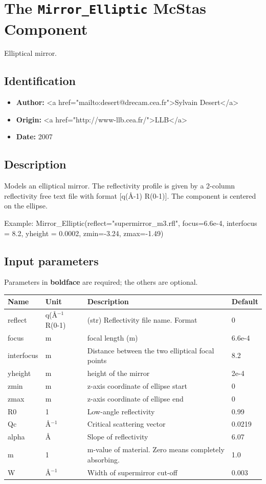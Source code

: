 \section{The \texttt{Mirror\_Elliptic} McStas Component}
Elliptical mirror.

\subsection*{Identification}
\begin{itemize}
  \item \textbf{Author:} \textless{}a href="mailto:desert@drecam.cea.fr"\textgreater{}Sylvain Desert\textless{}/a\textgreater{}
  \item \textbf{Origin:} \textless{}a href="http://www-llb.cea.fr/"\textgreater{}LLB\textless{}/a\textgreater{}
  \item \textbf{Date:} 2007
\end{itemize}

\subsection*{Description}
Models an elliptical mirror. The reflectivity profile is given by a 2-column reflectivity free text file with format [q(\AA{}-1) R(0-1)]. The component is centered on the ellipse.

Example: Mirror\_Elliptic(reflect="supermirror\_m3.rfl", focus=6.6e-4, interfocus = 8.2, yheight = 0.0002, zmin=-3.24, zmax=-1.49)

\subsection*{Input parameters}
Parameters in \textbf{boldface} are required; the others are optional.

\begin{longtable}{p{}p{}p{}p{}}
\toprule
\textbf{Name} & \textbf{Unit} & \textbf{Description} & \textbf{Default} \\
\midrule
\endhead
reflect & q(\AA{}$^{-1}$ R(0-1) & (str) Reflectivity file name. Format & 0 \\
focus & m & focal length (m) & 6.6e-4 \\
interfocus & m & Distance between the two elliptical focal points & 8.2 \\
yheight & m & height of the mirror & 2e-4 \\
zmin & m & z-axis coordinate of ellipse start & 0 \\
zmax & m & z-axis coordinate of ellipse end & 0 \\
R0 & 1 & Low-angle reflectivity & 0.99 \\
Qc & \AA{}$^{-1}$ & Critical scattering vector & 0.0219 \\
alpha & \AA{} & Slope of reflectivity & 6.07 \\
m & 1 & m-value of material. Zero means completely absorbing. & 1.0 \\
W & \AA{}$^{-1}$ & Width of supermirror cut-off & 0.003 \\
\bottomrule
\end{longtable}

